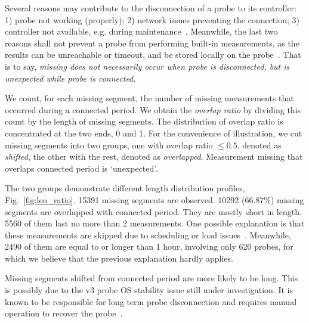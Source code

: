 Several reasons may contribute to the disconnection of a probe to its controller: 1) probe not working (properly); 2) network issues preventing the connection; 3) controller not available, e.g. during maintenance~\cite{controller}. Meanwhile, the last two reasons shall not prevent a probe from performing built-in measurements, as the results can be unreachable or timeout, and be stored locally on the probe~\cite{usb}. 
That is to say, \textit{missing does not necessarily occur when probe is disconnected, but is unexpected while probe is connected.}

We count, for each missing segment, the number of missing measurements that occurred during a connected period.
We obtain the \textit{overlap ratio} by dividing this count by the length of missing segments. 
The distribution of overlap ratio is concentrated at the two ends, 0 and 1. 
For the convenience of illustration, we cut missing segments into two groups, one with overlap ratio $\leq0.5$, denoted as \textit{shifted}, the other with the rest, denoted as \textit{overlapped}.
Measurement missing that overlaps connected period is `unexpected'.

The two groups demonstrate different length distribution profiles, Fig.~\ref{fig:len_ratio}.
15391 missing segments are observed. 
10292 (66.87\%) missing segments are overlapped with connected period. 
They are mostly short in length. 5560 of them last no more than 2 measurements. 
One possible explanation is that these measurements are skipped due to scheduling or load issues~\cite{schedule, Holterbach2015a}.
Meanwhile, 2490 of them are equal to or longer than 1 hour, involving only 620 probes, for which we believe that the previous explanation hardly applies.

Missing segments shifted from connected period are more likely to be long. This is possibly due to the v3 probe OS stability issue still under investigation. It is known to be responsible for long term probe disconnection and requires manual operation to recover the probe~\cite{usb, 1look, 2look, 3look}.

